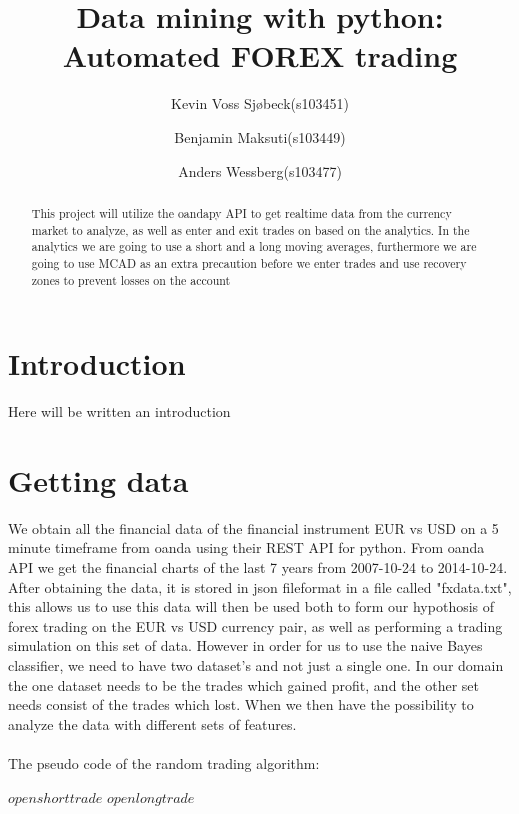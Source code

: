 \documentclass[10pt]{IEEEtran}
\title{Data mining with python: \\Automated FOREX trading}
\author{
	Kevin Voss Sjøbeck(s103451)\\
	\and
	Benjamin Maksuti(s103449)\\
	\and
	Anders Wessberg(s103477)
}
\begin{document}
\maketitle

\begin{abstract}
This project will utilize the oandapy API to get realtime data from the currency market to analyze, as well as enter and exit trades on based on the analytics. In the analytics we are going to use a short and a long moving averages, furthermore we are going to use MCAD as an extra precaution before we enter trades and use recovery zones to prevent losses on the account
\end{abstract}

\section{Introduction}
Here will be written an introduction


\section{Getting data}
We obtain all the financial data of the financial instrument EUR vs USD on a 5 minute timeframe from oanda using their REST API for python. From oanda API we get the financial charts of the last 7 years from 2007-10-24 to 2014-10-24. After obtaining the data, it is stored in json fileformat in a file called "fxdata.txt", this allows us to use this data will then be used both to form our hypothosis of forex trading on the EUR vs USD currency pair, as well as performing a trading simulation on this set of data. However in order for us to use the naive Bayes classifier, we need to have two dataset's and not just a single one. In our domain the one dataset needs to be the trades which gained profit, and the other set needs consist of the trades which lost. When we then have the possibility to analyze the data with different sets of features.\\
\\
The pseudo code of the random trading algorithm:
\begin{center}
\begin{algorithmic}
    	\State $open short trade$
    	\State $open long trade$	    
	\EndIf
\EndWhile
\end{algorithmic}
\end{center}
\end{document}
